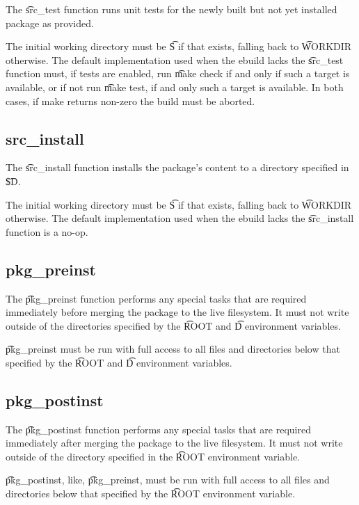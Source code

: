 The \t{src\_test} function runs unit tests for the newly built but not yet installed package as
provided.

The initial working directory must be \t{S} if that exists, falling back to \t{WORKDIR} otherwise.
The default implementation used when the ebuild lacks the \t{src\_test} function must, if tests are
enabled, run \t{make check} if and only if such a target is available, or if not run \t{make test},
if and only such a target is available. In both cases, if make returns non-zero the build must be
aborted.

\subsection{src\_install}
\label{src-install-function}

The \t{src\_install} function installs the package's content to a directory specified in
\t{\${D}}.

The initial working directory must be \t{S} if that exists, falling back to \t{WORKDIR} otherwise.
The default implementation used when the ebuild lacks the \t{src\_install} function is a no-op.

\subsection{pkg\_preinst}
\label{pkg-preinst-function}

The \t{pkg\_preinst} function performs any special tasks that are required immediately before
merging the package to the live filesystem. It must not write outside of the directories specified
by the \t{ROOT} and \t{D} environment variables.

\t{pkg\_preinst} must be run with full access to all files and directories below that specified by
the \t{ROOT} and \t{D} environment variables.

\subsection{pkg\_postinst}
\label{pkg-postinst-function}

The \t{pkg\_postinst} function performs any special tasks that are required immediately after
merging the package to the live filesystem. It must not write outside of the directory specified
in the \t{ROOT} environment variable.

\t{pkg\_postinst}, like, \t{pkg\_preinst}, must be run with full access to all files and directories
below that specified by the \t{ROOT} environment variable.

